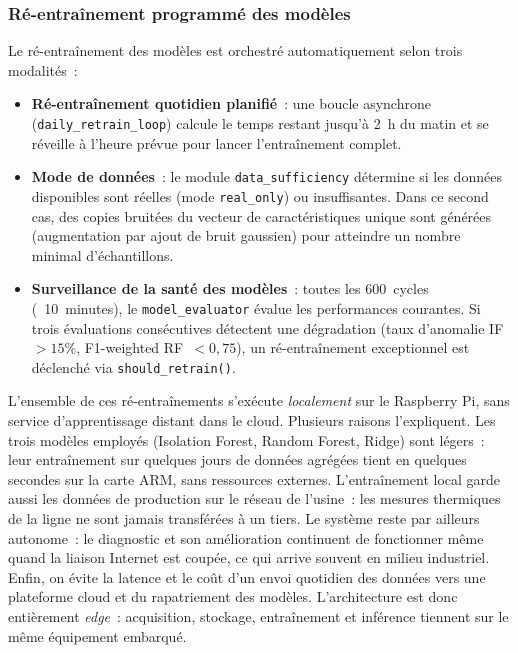 \subsubsection{Ré-entraînement programmé des modèles}

Le ré-entraînement des modèles est orchestré automatiquement selon trois modalités~:

\begin{itemize}
  \item \textbf{Ré-entraînement quotidien planifié}~: une boucle asynchrone (\texttt{daily\_retrain\_loop}) calcule le temps restant jusqu'à 2~h du matin et se réveille à l'heure prévue pour lancer l'entraînement complet.
  \item \textbf{Mode de données}~: le module \texttt{data\_sufficiency} détermine si les données disponibles sont réelles (mode \texttt{real\_only}) ou insuffisantes. Dans ce second cas, des copies bruitées du vecteur de caractéristiques unique sont générées (augmentation par ajout de bruit gaussien) pour atteindre un nombre minimal d'échantillons.
  \item \textbf{Surveillance de la santé des modèles}~: toutes les 600~cycles (~10~minutes), le \texttt{model\_evaluator} évalue les performances courantes. Si trois évaluations consécutives détectent une dégradation (taux d'anomalie IF~\(>15\%\), F1-weighted RF~\(<0,75\)), un ré-entraînement exceptionnel est déclenché via \texttt{should\_retrain()}.
\end{itemize}

L'ensemble de ces ré-entraînements s'exécute \emph{localement} sur le Raspberry Pi, sans service d'apprentissage distant dans le cloud. Plusieurs raisons l'expliquent. Les trois modèles employés (Isolation Forest, Random Forest, Ridge) sont légers~: leur entraînement sur quelques jours de données agrégées tient en quelques secondes sur la carte ARM, sans ressources externes. L'entraînement local garde aussi les données de production sur le réseau de l'usine~: les mesures thermiques de la ligne ne sont jamais transférées à un tiers. Le système reste par ailleurs autonome~: le diagnostic et son amélioration continuent de fonctionner même quand la liaison Internet est coupée, ce qui arrive souvent en milieu industriel. Enfin, on évite la latence et le coût d'un envoi quotidien des données vers une plateforme cloud et du rapatriement des modèles. L'architecture est donc entièrement \emph{edge}~: acquisition, stockage, entraînement et inférence tiennent sur le même équipement embarqué.

